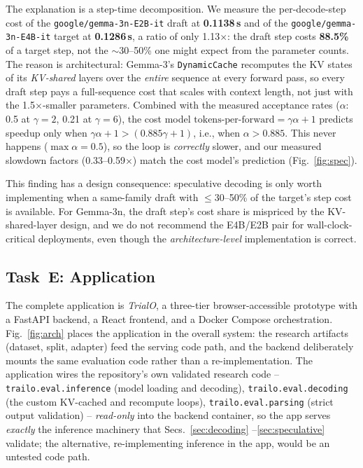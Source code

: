 \documentclass[conference]{IEEEtran}
\newcommand{\code}[1]{\texttt{\small #1}}
\newcommand{\modelname}{\texttt{google/gemma-3n-E4B-it}}
\newcommand{\draftname}{\texttt{google/gemma-3n-E2B-it}}
\begin{document}
The explanation is a step-time decomposition. We measure the
per-decode-step cost of the \draftname{} draft at
\textbf{0.1138\,s} and of the \modelname{} target at
\textbf{0.1286\,s}, a ratio of only 1.13$\times$: the draft step
costs \textbf{88.5\%} of a target step, not the
$\sim$30--50\% one might expect from the parameter counts.
The reason is architectural: Gemma-3's \code{DynamicCache}
recomputes the KV states of its \emph{KV-shared} layers over the
\emph{entire} sequence at every forward pass, so every draft step
pays a full-sequence cost that scales with context length,
not just with the 1.5$\times$-smaller
parameters. Combined with the measured acceptance rates
($\alpha$: 0.5 at $\gamma{=}2$, 0.21 at $\gamma{=}6$), the
cost model
$\text{tokens-per-forward} = \gamma \alpha + 1$ predicts
speedup only when $\gamma \alpha + 1 > (0.885\gamma + 1)$, i.e.,
when $\alpha > 0.885$. This never happens
($\max \alpha = 0.5$), so the loop is
\emph{correctly} slower, and our measured slowdown factors
(0.33--0.59$\times$) match the cost model's prediction
(Fig.~\ref{fig:spec}).

This finding has a design consequence: speculative decoding is
only worth implementing when a same-family draft with
$\leq$30--50\% of the target's step cost is available. For
Gemma-3n, the draft step's cost share is mispriced by the
KV-shared-layer design, and we do not recommend the
E4B/E2B pair for wall-clock-critical deployments, even
though the \emph{architecture-level} implementation is correct.

\subsection{Task~E: Application}
\label{sec:application}

The complete application is \emph{TrialO}, a three-tier
browser-accessible prototype with a FastAPI backend, a React
frontend, and a Docker Compose orchestration. Fig.~\ref{fig:arch}
places the application in the overall system: the research artifacts
(dataset, split, adapter) feed the serving code path, and the
backend deliberately mounts the same evaluation code rather than a
re-implementation. The application
wires the repository's own validated research code --
\code{trailo.eval.inference} (model loading and decoding),
\code{trailo.eval.decoding} (the custom KV-cached and recompute
loops), \code{trailo.eval.parsing} (strict output validation) --
\emph{read-only} into the backend container, so the app serves
\emph{exactly} the inference machinery that Secs.~\ref{sec:decoding}%
--\ref{sec:speculative} validate; the alternative, re-implementing
inference in the app, would be an untested code path.
\end{document}
